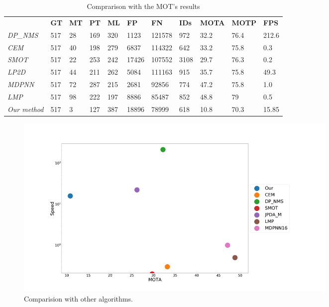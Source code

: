 \begin{table}[!]
\centering
\begin{tabular}{l|llll|lll|ll|l}
                 & \textbf{GT} & \textbf{MT} & \textbf{PT} & \textbf{ML} & \textbf{FP} & \textbf{FN} & \textbf{IDs} & \textbf{MOTA} & \textbf{MOTP} & \textbf{FPS} \\
\textit{DP\_NMS} \cite{dpnms} & 517         & 28          & 169         & 320         & 1123        & 121578      & 972          & 32.2          & 76.4          & 212.6        \\
\textit{CEM} \cite{cem}             & 517         & 40          & 198         & 279         & 6837        & 114322      & 642          & 33.2          & 75.8          & 0.3          \\
\textit{SMOT} \cite{smot}    & 517         & 22          & 253         & 242         & 17426       & 107552      & 3108         & 29.7          & 76.3          & 0.2          \\
\textit{LP2D} \cite{mot}   & 517         & 44          & 211         & 262         & 5084        & 111163      & 915          & 35.7          & 75.8          & 49.3         \\
\textit{MDPNN} \cite{savaresee}  & 517         & 72          & 287         & 215         & 2681        & 92856       & 774          & 47.2          & 75.8          & 1.0          \\
\textit{LMP}  \cite{lmp}   & 517         & 98          & 222         & 197         & 8886        & 85487       & 852          & 48.8          & 79            & 0.5          \\
\textit{Our method}     & 517         & 3           & 127         & 387         & 18896       & 78999       & 618          & 10.8          & 70.3          & 15.85       
\end{tabular}
\caption{Comprarison with the MOT's results}
\label{tableSOTatomeu}
\end{table}



\begin{figure}[!]
\centering         
\includegraphics[width=16cm]{comparision/timeDAta.png}
\caption{Comparision with other algorithms.} \label{experimenComp}
\end{figure}




